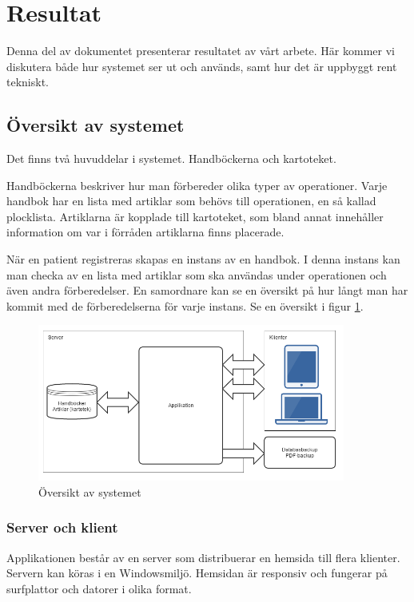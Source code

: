 \section{Resultat}
Denna del av dokumentet presenterar resultatet av vårt arbete.
Här kommer vi diskutera både hur systemet ser ut och används, samt hur
det är uppbyggt rent tekniskt.

\subsection{Översikt av systemet}
Det finns två huvuddelar i systemet. Handböckerna och kartoteket.

Handböckerna beskriver hur man förbereder olika typer av operationer.
Varje handbok har en lista med artiklar som behövs till operationen, en så kallad plocklista.
Artiklarna är kopplade till kartoteket, som bland annat innehåller information om var i förråden artiklarna finns placerade.

När en patient registreras skapas en instans av en handbok.
I denna instans kan man checka av en lista med artiklar som ska användas under operationen och även andra förberedelser.
En samordnare kan se en översikt på hur långt man har kommit med de förberedelserna för varje instans.
Se en översikt i figur \ref{fig:overview}.

\begin{figure}[htbp]
  \centering
  \includegraphics[width=0.9\textwidth]{images/overview.png}
  \caption{Översikt av systemet}
  \label{fig:overview}
\end{figure}

\subsubsection{Server och klient}
Applikationen består av en server som distribuerar en hemsida till flera klienter.
Servern kan köras i en Windowsmiljö.
Hemsidan är responsiv och fungerar på surfplattor och datorer i olika format.

